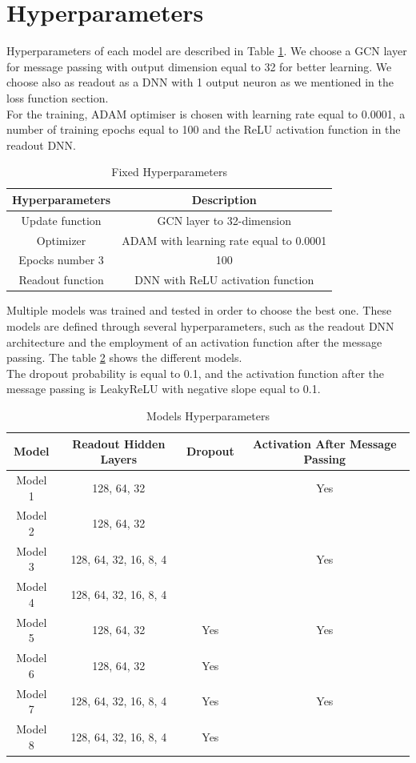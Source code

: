\section{Hyperparameters} 
Hyperparameters of each model are described in Table \ref{table:fhp_table}. We choose a GCN layer for message passing with output dimension equal to 32 for better learning.
We choose also as readout as a DNN with 1 output neuron as we mentioned in the loss function section.\\ 
For the training, ADAM optimiser is chosen with learning rate equal to 0.0001, a number of training epochs equal to 100 and  the ReLU activation function in the readout DNN.\\


\begin{table}[H]
\centering
\begin{tabular}{|c|c|}
\hline
Hyperparameters & Description  \\
\hline
Update function & GCN layer to 32-dimension \\
\hline
Optimizer & ADAM with learning rate equal to 0.0001  \\
\hline
Epocks number 3 & 100  \\
\hline
Readout function & DNN with ReLU activation function \\
\hline
\end{tabular}
\caption{Fixed Hyperparameters}
\label{table:fhp_table}
\end{table}


Multiple models was trained and tested in order to choose the best one. These models are defined through several hyperparameters, such as the readout DNN architecture and  the employment of an activation function after the message passing. 
The table \ref{table:hp_table} shows the different models.
\\The dropout probability is equal to 0.1, and the activation function after the message passing is LeakyReLU with negative slope equal to 0.1.
\begin{table}[H]
\centering
\begin{tabular}{|c|c|c|c|}
\hline
Model & Readout Hidden Layers & Dropout & Activation After Message Passing \\
\hline
Model 1 & 128, 64, 32 & & Yes \\
\hline
Model 2 & 128, 64, 32 & & \\
\hline
Model 3 & 128, 64, 32, 16, 8, 4 & & Yes \\
\hline
Model 4 & 128, 64, 32, 16, 8, 4 & & \\
\hline
Model 5 & 128, 64, 32 & Yes & Yes \\
\hline
Model 6 & 128, 64, 32 & Yes & \\
\hline
Model 7 & 128, 64, 32, 16, 8, 4 & Yes & Yes \\
\hline
Model 8 & 128, 64, 32, 16, 8, 4 & Yes & \\
\hline
\end{tabular}
\caption{Models Hyperparameters}
\label{table:hp_table}
\end{table}


